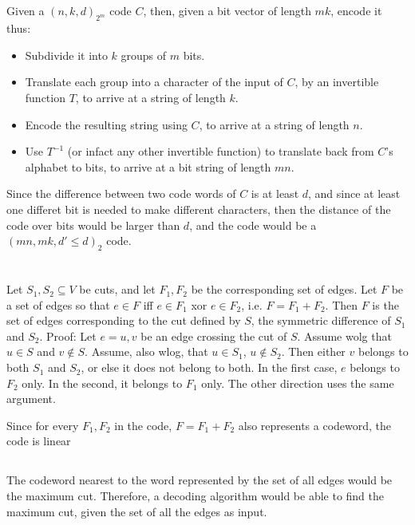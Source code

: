 \documentclass[11pt]{article} \usepackage{amssymb}
\begin{document}
\subsection{}
Given a $(n,k,d)_{2^m}$ code $C$, then, given a bit vector of length $mk$,
encode it thus:
\begin{itemize}
\item Subdivide it into $k$ groups of $m$ bits.
\item Translate each group into a character of the input of $C$, by 
      an invertible function $T$, to arrive at a string of length $k$.
\item Encode the resulting string using $C$, to arrive at a string of
      length $n$.
\item Use $T^{-1}$ (or infact any other invertible function) to translate
      back from $C$'s alphabet to bits, to arrive at a bit string
      of length $mn$.
\end{itemize}

Since the difference between two code words of $C$ is at least $d$, and since
at least one differet bit is needed to make different characters, then
the distance of the code over bits would be larger than $d$, and the code
would be a $(mn,mk,d'\leq d)_2$ code. 

\section{}
\subsection{}
Let $S_1,S_2 \subseteq V$ be cuts, and let $F_1,F_2$ be the corresponding
set of edges. Let $F$ be a set of edges so that $e\in F$ iff 
$e\in F_1$ xor $e\in F_2$, i.e. $F=F_1+F_2$. Then $F$ is the set of edges corresponding
to the cut defined by $S$, the symmetric difference of $S_1$ and $S_2$. Proof:
Let $e={u,v}$ be an edge crossing the cut of $S$. Assume wolg that 
$u\in S$ and $v \not \in S$. Assume, also wlog, that $u\in S_1$, $u \not \in S_2$. Then either $v$ belongs
to both $S_1$ and $S_2$, or else it does not belong to both. In the first
case, $e$ belongs to $F_2$ only. In the second, it belongs to $F_1$ only.
The other direction uses the same argument.

Since for every $F_1,F_2$ in the code, $F=F_1+F_2$ also represents a codeword, 
the code is linear

\subsection{}
The codeword nearest to the word represented by the set of all edges would
be the maximum cut. Therefore, a decoding algorithm would be able to find
the maximum cut, given the set of all the edges as input.
\end{document}

